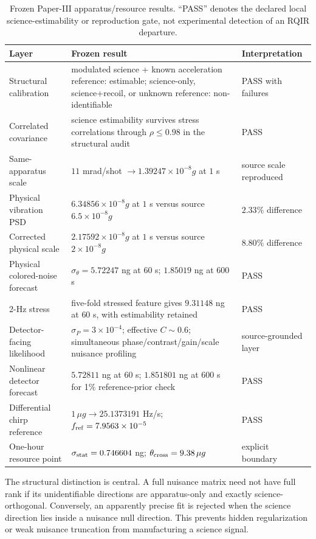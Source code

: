 \begin{table}[t]
\caption{Frozen Paper-III apparatus/resource results. ``PASS'' denotes the declared local science-estimability or reproduction gate, not experimental detection of an RQIR departure.}
\label{tab:results}
\begin{ruledtabular}
\begin{tabular}{p{}p{}p{}}
Layer & Frozen result & Interpretation\\
\hline
Structural calibration & modulated science + known acceleration reference: estimable; science-only, science+recoil, or unknown reference: non-identifiable & PASS with failures\\
Correlated covariance & science estimability survives stress correlations through $\rho\le0.98$ in the structural audit & PASS\\
Same-apparatus scale & $11$ mrad/shot $\rightarrow1.39247\times10^{-8}g$ at $1$ s & source scale reproduced\\
Physical vibration PSD & $6.34856\times10^{-8}g$ at $1$ s versus source $6.5\times10^{-8}g$ & $2.33\%$ difference\\
Corrected physical scale & $2.17592\times10^{-8}g$ at $1$ s versus source $2\times10^{-8}g$ & $8.80\%$ difference\\
Physical colored-noise forecast & $\sigma_\theta=5.72247$ ng at $60$ s; $1.85019$ ng at $600$ s & PASS\\
2-Hz stress & five-fold stressed feature gives $9.31148$ ng at $60$ s, with estimability retained & PASS\\
Detector-facing likelihood & $\sigma_P=3\times10^{-4}$; effective $C\sim0.6$; simultaneous phase/contrast/gain/scale nuisance profiling & source-grounded layer\\
Nonlinear detector forecast & $5.72811$ ng at $60$ s; $1.851801$ ng at $600$ s for 1\% reference-prior check & PASS\\
Differential chirp reference & $1\,\mu g\rightarrow25.1373191$ Hz/s; $f_{\rm ref}=7.9563\times10^{-5}$ & PASS\\
One-hour resource point & $\sigma_{\rm stat}=0.746604$ ng; $\theta_{\rm cross}=9.38\,\mu g$ & explicit boundary\\
\end{tabular}
\end{ruledtabular}
\end{table}

The structural distinction is central. A full nuisance matrix need not have full rank if its unidentifiable directions are apparatus-only and exactly science-orthogonal. Conversely, an apparently precise fit is rejected when the science direction lies inside a nuisance null direction. This prevents hidden regularization or weak nuisance truncation from manufacturing a science signal.

